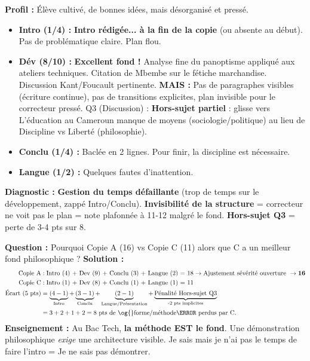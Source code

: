 \documentclass[11pt]{article}
\newcommand{\cle}[1]{{\popxbold\color{popdark}#1}}
\begin{document}
\begin{exemplebox}
\textbf{Profil :} \'El\`eve cultiv\'e, de bonnes id\'ees, mais d\'esorganis\'e et press\'e.
\begin{itemize}
    \item \textbf{Intro (1/4) :} \textbf{Intro r\'edig\'ee... \`a la fin de la copie} (ou absente au d\'ebut). Pas de probl\'ematique claire. Plan flou.
    \item \textbf{D\'ev (8/10) :} \textbf{Excellent fond !} Analyse fine du \cle{panoptisme} appliqu\'e aux ateliers techniques. Citation de Mbembe sur le \cle{f\'etiche} marchandise. Discussion Kant/Foucault pertinente. \textbf{MAIS :} Pas de paragraphes visibles (\'ecriture continue), pas de transitions explicites, plan invisible pour le correcteur press\'e. Q3 (Discussion) : \textbf{Hors-sujet partiel} : glisse vers \og{}L'\'education au Cameroun manque de moyens\fg{} (sociologie/politique) au lieu de \og{}Discipline vs Libert\'e\fg{} (philosophie).
    \item \textbf{Conclu (1/4) :} Bacl\'ee en 2 lignes. \og{}Pour finir, la discipline est n\'ecessaire.\fg{}
    \item \textbf{Langue (1/2) :} Quelques fautes d'inattention.
\end{itemize}
\textbf{Diagnostic :} \textbf{Gestion du temps d\'efaillante} (trop de temps sur le d\'eveloppement, zapp\'e Intro/Conclu). \textbf{Invisibilit\'e de la structure} = correcteur ne voit pas le plan = note plafonn\'ee \`a 11-12 malgr\'e le fond. \textbf{Hors-sujet Q3} = perte de 3-4 pts sur 8.
\end{exemplebox}

\begin{exoresolu}
\textbf{Question :} Pourquoi Copie A (16) vs Copie C (11) alors que C a un meilleur fond philosophique ?
\textbf{Solution :}
\begin{align*}
\text{Copie A} &: \text{Intro (4) + Dev (9) + Conclu (3) + Langue (2) = 18} \rightarrow \text{Ajustement s\'ev\'erit\'e ouverture } \rightarrow \mathbf{16} \\
\text{Copie C} &: \text{Intro (1) + Dev (8) + Conclu (1) + Langue (1) = 11} \\
\text{\'Ecart (5 pts)} &= \underbrace{(4-1)}_{\text{Intro}} + \underbrace{(3-1)}_{\text{Conclu}} + \underbrace{(2-1)}_{\text{Langue/Pr\'esentation}} + \underbrace{\text{P\'enalit\'e Hors-sujet Q3}}_{\text{-2 pts implicites}} \\
&= 3 + 2 + 1 + 2 = 8 \text{ pts de \og{}forme/m\'ethode\fg{} perdus par C.}
\end{align*}
\textbf{Enseignement :} Au Bac Tech, \textbf{la m\'ethode EST le fond}. Une d\'emonstration philosophique \emph{exige} une architecture visible. \og{}Je sais mais je n'ai pas le temps de faire l'intro\fg{} = \og{}Je ne sais pas d\'emontrer\fg{}.
\end{exoresolu}
\end{document}
